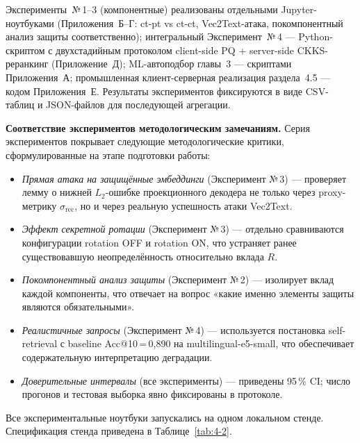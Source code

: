 \documentclass[a4paper, 12pt, oneside, openany]{article}
\begin{document}
Эксперименты~№\,1--3 (компонентные) реализованы отдельными Jupyter-ноутбуками (Приложения~Б--Г: ct-pt vs ct-ct, Vec2Text-атака, покомпонентный анализ защиты соответственно); интегральный Эксперимент~№\,4 --- Python-скриптом с двухстадийным протоколом client-side PQ + server-side CKKS-реранкинг (Приложение~Д); ML-автоподбор главы~3 --- скриптами Приложения~А; промышленная клиент-серверная реализация раздела~4.5 --- кодом Приложения~Е. Результаты экспериментов фиксируются в виде CSV-таблиц и JSON-файлов для последующей агрегации.

\textbf{Соответствие экспериментов методологическим замечаниям.} Серия экспериментов покрывает следующие методологические критики, сформулированные на этапе подготовки работы:
\begin{itemize}
	\item \emph{Прямая атака на защищённые эмбеддинги} (Эксперимент №\,3) --- проверяет лемму о нижней $L_2$-ошибке проекционного декодера не только через proxy-метрику $\sigma_{\mathrm{rec}}$, но и через реальную успешность атаки Vec2Text.
	\item \emph{Эффект секретной ротации} (Эксперимент №\,3) --- отдельно сравниваются конфигурации rotation OFF и rotation ON, что устраняет ранее существовавшую неопределённость относительно вклада $R$.
	\item \emph{Покомпонентный анализ защиты} (Эксперимент №\,2) --- изолирует вклад каждой компоненты, что отвечает на вопрос «какие именно элементы защиты являются обязательными».
	\item \emph{Реалистичные запросы} (Эксперимент №\,4) --- используется постановка self-retrieval с baseline Acc@10\,=\,0,890 на multilingual-e5-small, что обеспечивает содержательную интерпретацию деградации.
	\item \emph{Доверительные интервалы} (все эксперименты) --- приведены 95\,\% CI; число прогонов и тестовая выборка явно фиксированы в протоколе.
\end{itemize}


 Все экспериментальные ноутбуки запускались на одном локальном стенде. Спецификация стенда приведена в Таблице~\ref{tab:4-2}.
\end{document}
